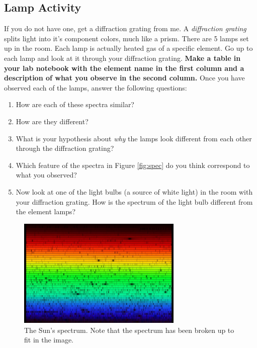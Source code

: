 \documentclass[11pt]{article}
\begin{document}
\subsection{Lamp Activity}

If you do not have one, get a diffraction grating from me.  A \textit{diffraction grating} splits light into it's component colors, much like a prism.  There are 5 lamps set up in the room.  Each lamp is actually heated gas of a specific element.  Go up to each lamp and look at it through your diffraction grating.  \textbf{Make a table in your lab notebook with the element name in the first column and a description of what you observe in the second column.}  Once you have observed each of the lamps, answer the following questions:
\begin{enumerate}
    \item How are each of these spectra similar?
    \item How are they different?
    \item What is your hypothesis about \textit{why} the lamps look different from each other through the diffraction grating?
    \item Which feature of the spectra in Figure \ref{fig:spec} do you think correspond to what you observed?
    \item Now look at one of the light bulbs (a source of white light) in the room with your diffraction grating.  How is the spectrum of the light bulb different from the element lamps?
\end{enumerate}

\begin{figure}[h!]
    \centering
    \includegraphics[width=0.7\textwidth]{Images/sun_spec.jpg}
    \caption{The Sun's spectrum. Note that the spectrum has been broken up to fit in the image.}
    \label{fig:sun}
\end{figure}
\end{document}
